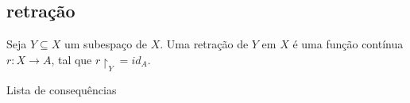 \subsection{retração}
\label{retração-def}
\begin{defi}[Retração]
Seja $Y \subseteq X$ um subespaço de $X$. Uma retração de $Y$ em $X$ é uma função contínua $r:X \to A$, tal que $r\restriction_Y = id_A$.	 
\end{defi}

\begin{titlemize}{Lista de consequências}
	\item \hyperref[teo-ponto-fixo-Brower]{}
\end{titlemize}
